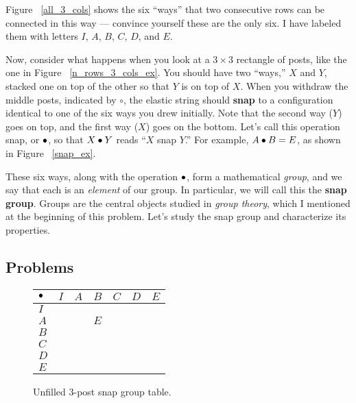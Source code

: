 \documentclass[../gatm.tex]{subfiles}
\begin{document}
Figure ~\ref{all_3_cols} shows the six ``ways'' that two consecutive rows can be connected in this way --- convince yourself these are the only six. I have labeled them with letters $I$, $A$, $B$, $C$, $D$, and $E$.

Now, consider what happens when you look at a $3\times 3$ rectangle of posts, like the one in Figure ~\ref{n_rows_3_cols_ex}. You should have two ``ways,'' $X$ and $Y$, stacked one on top of the other so that $Y$ is on top of $X$. When you withdraw the middle posts, indicated by $\circ$, the elastic string should \textbf{snap} to a configuration identical to one of the six ways you drew initially. Note that the second way ($Y$) goes on top, and the first way ($X$) goes on the bottom. Let's call this operation snap, or $\bullet$, so that $X\bullet Y$ reads ``$X$ snap $Y$.'' For example, $A\bullet B = E$, as shown in Figure ~\ref{snap_ex}.

These six ways, along with the operation $\bullet$, form a mathematical \textit{group}, and we say that each is an \textit{element} of our group. In particular, we will call this the \textbf{snap group}. Groups are the central objects studied in \textit{group theory}, which I mentioned at the beginning of this problem. Let's study the snap group and characterize its properties.

\subsection{Problems}


\begin{figure}
\begin{center}
\begin{tabular}{C|C|C|C|C|C|C|}
$\bullet$ & $I$ & $A$ & $B$ & $C$ & $D$ & $E$ \\ \hline
$I$    &   &   &   &   &   &   \\ \hline
$A$    &   &   & $E$ &   &   &   \\ \hline
$B$    &   &   &   &   &   &   \\ \hline
$C$    &   &   &   &   &   &   \\ \hline
$D$    &   &   &   &   &   &   \\ \hline
$E$    &   &   &   &   &   &   \\ \hline
\end{tabular}
\end{center}
\caption{Unfilled $3$-post snap group table.}
\label{sbstable}
\end{figure}
\end{document}
